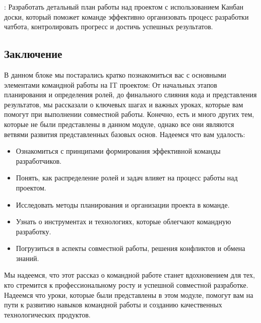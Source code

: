 \documentclass[letterpaper,10pt,russian]{sphinxmanual}
\begin{document}
\sphinxAtStartPar
{}: Разработать детальный план работы над проектом с использованием Канбан доски, который поможет команде эффективно организовать процесс разработки чат\sphinxhyphen{}бота, контролировать прогресс и достичь успешных результатов.


\subsection{Заключение}
\label{\detokenize{educational_materials/team_work_on_a_project/content:id3}}
\sphinxAtStartPar
В данном блоке мы постарались кратко познакомиться вас с основными элементами командной работы на IT проектом: От начальных этапов планирования и определения ролей, до финального слияния кода и представления результатов, мы рассказали о ключевых шагах и важных уроках, которые вам помогут при выполнении совместной работы. Конечно, есть и много других тем, которые не были представлены в данном модуле, однако все они являются ветвями развития представленных базовых основ. Надеемся что вам удалость:
\begin{itemize}
\item {} 
\sphinxAtStartPar
Ознакомиться с принципами формирования эффективной команды разработчиков.

\item {} 
\sphinxAtStartPar
Понять, как распределение ролей и задач влияет на процесс работы над проектом.

\item {} 
\sphinxAtStartPar
Исследовать методы планирования и организации проекта в команде.

\item {} 
\sphinxAtStartPar
Узнать о инструментах и технологиях, которые облегчают командную разработку.

\item {} 
\sphinxAtStartPar
Погрузиться в аспекты совместной работы, решения конфликтов и обмена знаний.

\end{itemize}

\sphinxAtStartPar
Мы надеемся, что этот рассказ о командной работе станет вдохновением для тех, кто стремится к профессиональному росту и успешной совместной разработке. Надеемся что уроки, которые были представлены в этом модуле, помогут вам на пути к развитию навыков командной работы и созданию качественных технологических продуктов.
\end{document}
